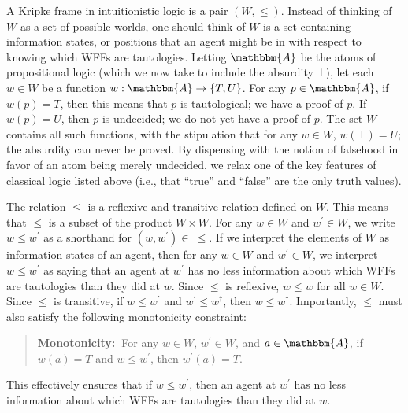 \documentclass[11pt]{article}
\theoremstyle{definition}
\theoremstyle{remark}
\begin{document}
A Kripke frame in intuitionistic logic is a pair $(W,\leq)$. Instead of thinking of $W$ as a set of possible worlds, one should think of $W$ is a set containing information states, or positions that an agent might be in with respect to knowing which WFFs are tautologies. Letting $\mathbbm{A}$ be the atoms of propositional logic (which we now take to include the absurdity $\bot$), let each $w\in W$ be a function $w:\mathbbm{A}\rightarrow\{T,U\}$. For any $p\in\mathbbm{A}$, if $w(p)=T$, then this means that $p$ is tautological; we have a proof of $p$. If $w(p)=U$, then $p$ is undecided; we do not yet have a proof of $p$. The set $W$ contains all such functions, with the stipulation that for any $w\in W$, $w(\bot)=U$; the absurdity can never be proved. By dispensing with the notion of falsehood in favor of an atom being merely undecided, we relax one of the key features of classical logic listed above (i.e., that ``true'' and ``false'' are the only truth values).\par  


The relation $\leq$ is a reflexive and transitive relation defined on $W$. This means that $\leq$ is a subset of the product $W\times W$. For any $w\in W$ and $w^{\prime}\in W$, we write $w\leq w^{\prime}$ as a shorthand for $(w,w^{\prime})\in \ \leq$. If we interpret the elements of $W$ as information states of an agent, then for any $w\in W$ and $w^{\prime}\in W$, we interpret $w\leq w^{\prime}$ as saying that an agent at $w^{\prime}$ has no less information about which WFFs are tautologies than they did at $w$. Since $\leq$ is reflexive, $w\leq w$ for all $w\in W$. Since $\leq$ is transitive, if $w\leq w^{\prime}$ and $w^{\prime}\leq w^{\dagger}$, then $w\leq w^{\dagger}$. Importantly, $\leq$ must also satisfy the following monotonicity constraint:
\begin{quote}
    \textbf{Monotonicity:\ }For any $w\in W$, $w^{\prime}\in W$, and $a\in\mathbbm{A}$, if $w(a)=T$ and $w\leq w^{\prime}$, then $w^{\prime}(a)=T$.
\end{quote}
This effectively ensures that if $w\leq w^{\prime}$, then an agent at $w^{\prime}$ has no less information about which WFFs are tautologies than they did at $w$.\par 
\end{document}
